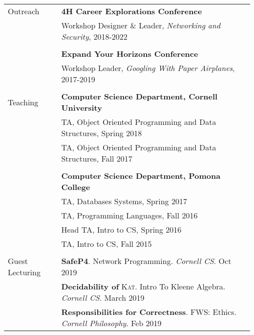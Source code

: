 \documentclass[letterpaper,10pt,oneside]{article}
\begin{document}
\begin{tabular}{@{} l l }
  \Large{Outreach}
  & \textbf{4H Career Explorations Conference} \\
  & Workshop Designer \& Leader, \emph{Networking and Security}, 2018-2022 \\
  & \\
  & \textbf{Expand Your Horizons Conference} \\
  & Workshop Leader, \emph{Googling With Paper Airplanes}, 2017-2019 \\
  & \\

  \Large{Teaching}
  & \textbf{Computer Science Department, Cornell University} \\
  
  & TA, Object Oriented Programming and Data Structures, Spring 2018 \\
  
  & TA, Object Oriented Programming and Data Structures, Fall 2017 \\
  &\\
  
  & \textbf{Computer Science Department, Pomona College} \\
  & TA, Databases Systems, Spring 2017 \\
  & TA, Programming Languages, Fall 2016 \\
  & Head TA, Intro to CS, Spring 2016 \\
  & TA, Intro to CS, Fall 2015 \\
  &\\

  \Large{Guest Lecturing}
  & \textbf{SafeP4}. Network Programming. \textit{Cornell CS}. Oct 2019 \\
  & \textbf{Decidability of }\textsc{Kat}. Intro To Kleene Algebra. \textit{Cornell CS}. March 2019 \\
  & \textbf{Responsibilities for Correctness}. FWS: Ethics. \textit{Cornell Philosophy}. Feb 2019\\

\end{tabular}
\end{document}
